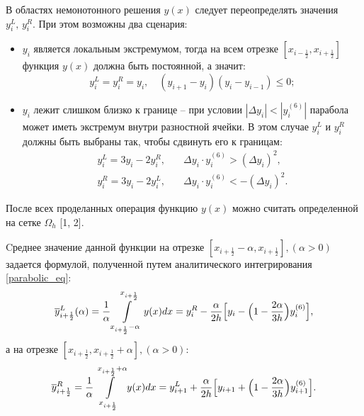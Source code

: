 \documentclass[12pt,a4paper]{article}
\newcommand{\half}{\frac{1}{2}}
\begin{document}
    В областях немонотонного решения $ y(x) $ следует переопределять значения $ y_i^L,\, y_i^R $. При этом возможны два сценария:
    \begin{itemize}
        \item $ y_i $ является локальным экстремумом, тогда на всем отрезке $ [x_{i-\half}, x_{i+\half}] $ функция $ y(x) $ должна быть постоянной, а значит:
        \begin{equation}
            \label{local_sup}
            y_i^L = y_i^R = y_i, \quad (y_{i+1} - y_i)(y_i - y_{i-1}) \leq 0;
        \end{equation}
                
        \item $ y_i $ лежит слишком близко к границе -- при условии $|\Delta y_i| < | y_i^{(6)} |$ парабола может иметь экстремум внутри разностной ячейки. В этом случае $ y_i^L $ и $ y_i^R $ должны быть выбраны так, чтобы сдвинуть его к границам:
        \begin{equation}
            \label{boundary_sup}
            \begin{split}
                y_i^L = 3y_i -2y_i^R, &\quad \Delta y_i \cdot y_i^{(6)} > (\Delta y_i)^2, \\
                y_i^R = 3y_i -2y_i^L, &\quad \Delta y_i \cdot y_i^{(6)} < -(\Delta y_i)^2.
            \end{split}  
        \end{equation}
    \end{itemize}

    После всех проделанных операция функцию $y(x)$ можно считать определенной на сетке $\Omega_h$ [1, 2]. 
    
    Cреднее значение данной функции на отрезке $ [x_{i+\half}-\alpha, x_{i+\half}], (\alpha > 0) $ задается формулой, полученной путем аналитического интегрирования \eqref{parabolic_eq}:
    \begin{equation}
        \label{average_positive}
        \overline y_{i+\half}^L(\alpha) = \dfrac{1}{\alpha} \displaystyle \int\limits_{x_{i+\half}-\alpha}^{x_{i+\half}} y(x) dx = y_i^R - \dfrac{\alpha}{2h}\Bigl[ \Delta y_i - \Bigl( 1 - \dfrac{2 \alpha}{3h} \Bigr)y_i^{(6)} \Bigr],
    \end{equation}
    \noindent а на отрезке $ [x_{i+\half}, x_{i+\half}+\alpha], (\alpha > 0)$:
    \begin{equation}
        \label{average_negative}
        \overline y_{i+\half}^R = \dfrac{1}{\alpha} \displaystyle \int\limits_{x_{i+\half}}^{x_{i+\half}+\alpha} y(x) dx = y_{i+1}^L  + \dfrac{\alpha}{2h} \Bigl[\Delta y_{i+1} + \Bigl( 1 - \dfrac{2\alpha}{3h} \Bigr) y_{i+1}^{(6)} \Bigr].
    \end{equation}
\end{document}
